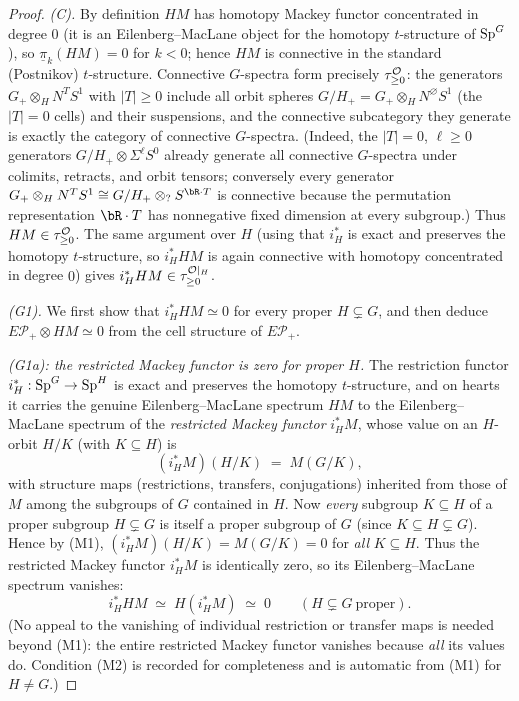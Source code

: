 \begin{proof}
\emph{(C).} By definition $HM$ has homotopy Mackey functor concentrated in
degree $0$ (it is an Eilenberg--MacLane object for the homotopy
$t$-structure of $\mathrm{Sp}^G$), so $\underline\pi_k(HM)=0$ for $k<0$; hence $HM$ is
connective in the standard (Postnikov) $t$-structure. Connective $G$-spectra
form precisely $\tau^{\mathcal{O}}_{\ge 0}$: the generators $G_+\otimes_H N^TS^1$ with
$|T|\ge 0$ include all orbit spheres $G/H_+=G_+\otimes_H N^{\varnothing}S^1$ (the
$|T|=0$ cells) and their suspensions, and the connective subcategory they
generate is exactly the category of connective $G$-spectra. (Indeed, the
$|T|=0$, $\ell\ge 0$ generators $G/H_+\otimes\Sigma^\ell S^0$ already generate all
connective $G$-spectra under colimits, retracts, and orbit tensors; conversely
every generator $G_+\otimes_H N^TS^1\cong G/H_+\otimes_? S^{\bR\cdot T}$ is
connective because the permutation representation $\bR\cdot T$ has nonnegative
fixed dimension at every subgroup.) Thus $HM\in\tau^{\mathcal{O}}_{\ge 0}$. The same
argument over $H$ (using that $i_H^\ast$ is exact and preserves the homotopy
$t$-structure, so $i_H^\ast HM$ is again connective with homotopy concentrated in
degree $0$) gives $i_H^\ast HM\in\tau^{\mathcal{O}|_H}_{\ge 0}$.

\emph{(G1).} We first show that $i_H^\ast HM\simeq 0$ for every proper
$H\subsetneq G$, and then deduce $E\mathcal P_+\otimes HM\simeq 0$ from the cell
structure of $E\mathcal P_+$.

\emph{(G1a): the restricted Mackey functor is zero for proper $H$.} The
restriction functor $i_H^\ast:\mathrm{Sp}^G\to\mathrm{Sp}^H$ is exact and preserves the
homotopy $t$-structure, and on hearts it carries the genuine Eilenberg--MacLane
spectrum $HM$ to the Eilenberg--MacLane spectrum of the \emph{restricted Mackey
functor} $i_H^\ast M$, whose value on an $H$-orbit $H/K$ (with $K\subseteq H$) is
\[
(i_H^\ast M)(H/K)\;=\;M(G/K),
\]
with structure maps (restrictions, transfers, conjugations) inherited from those
of $M$ among the subgroups of $G$ contained in $H$. Now \emph{every} subgroup
$K\subseteq H$ of a proper subgroup $H\subsetneq G$ is itself a proper subgroup
of $G$ (since $K\subseteq H\subsetneq G$). Hence by (M1),
$(i_H^\ast M)(H/K)=M(G/K)=0$ for \emph{all} $K\subseteq H$. Thus the restricted
Mackey functor $i_H^\ast M$ is identically zero, so its Eilenberg--MacLane
spectrum vanishes:
\[
i_H^\ast HM\;\simeq\;H(i_H^\ast M)\;\simeq\;0\qquad(H\subsetneq G\ \text{proper}).
\]
(No appeal to the vanishing of individual restriction or transfer maps is needed
beyond (M1): the entire restricted Mackey functor vanishes because \emph{all} its
values do. Condition (M2) is recorded for completeness and is automatic from (M1)
for $H\ne G$.)


\end{proof}
